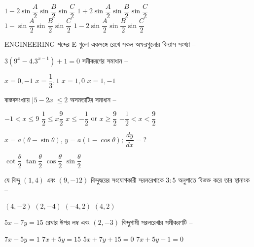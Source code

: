 \documentclass[addpoints]{exam}
\begin{document}
\begin{questions}
\begin{oneparchoices}
\choice $ 1-2\sin \dfrac{A}{2}\sin \dfrac{B}{2}\sin \dfrac{C}{2} $
\choice $ 1+2\sin \dfrac{A}{2}\sin \dfrac{B}{2}\sin \dfrac{C}{2} $\\
\choice $ 1-\sin \dfrac{A}{2}\sin \dfrac{B}{2}\sin \dfrac{C}{2} $
\choice $ 1-2\sin \dfrac{A}{2}\sin \dfrac{B}{2}\sin \dfrac{C}{2} $
\end{oneparchoices}

\question ENGINEERING শব্দের E গুলো একসঙ্গে রেখে সকল অক্ষরগুলোর বিন্যাস সংখ্যা – 

\begin{oneparchoices}
\end{oneparchoices}

\question $ 3(9^{x}-4.3^{x-1}) +1=0 $ সমীকরণের সমাধান – 
 
\begin{oneparchoices}
\choice $ x=0, -1 $
\choice $ x=\dfrac{1}{3}, 1 $
\choice $ x=1, 0 $
\choice $ x=1, -1 $
\end{oneparchoices}


\question বাস্তবসংখ্যায় $ |5-2x|\le 2 $ অসমতাটির সমাধান – 

\begin{oneparchoices}
\choice $ -1<x\le 9 $
\choice $ \dfrac{1}{2}\le x \dfrac{9}{2} $
\choice $ x\le -\dfrac{1}{2}$ or $ x\ge \dfrac{9}{2} $
\choice $ -\dfrac{1}{2}<x < \dfrac{9}{2} $
\end{oneparchoices}

\question $ x=a(\theta -\sin \theta),\, y = a(1-\cos\theta);\, \dfrac{dy}{dx}=?  $
 
\begin{oneparchoices}
\choice $ \cot\dfrac{\theta}{2} $
\choice $ \tan\dfrac{\theta}{2} $
\choice $ \cos\dfrac{\theta}{2} $
\choice $ \sin\dfrac{\theta}{2}$
\end{oneparchoices}

\question যে বিন্দু $ (1,4) $ এবং $ (9,-12) $ বিন্দুদ্বয়ের সংযোগকারী সরলরেখাকে $ 3:5 $ অনুপাতে বিভক্ত করে তার স্থানাংক –

\begin{oneparchoices}
\choice $ (4,-2) $
\choice $ (2,-4) $
\choice $ (-4, 2) $
\choice $ (4,2) $
\end{oneparchoices}

\question  $ 5x-7y =15 $ রেখার উপর লম্ব এবং $ (2,-3) $ বিন্দুগামী সরলরেখার সমীকরণটি –

\begin{oneparchoices}
\choice  $ 7x-5y=1 $
\choice  $ 7x+5y=15 $
\choice  $ 5x+7y+15=0 $
\choice  $ 7x+5y+1 =0 $
\end{oneparchoices}


\end{questions}
\end{document}
